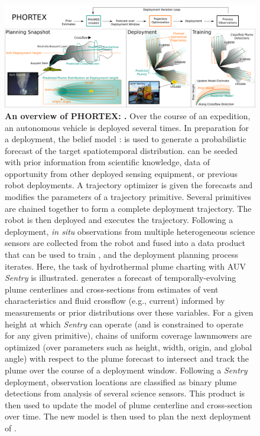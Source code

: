 \begin{figure}[h!]
    \centering
    \includegraphics[width=\columnwidth]{figures/summary_intro_figure.png}
    \caption[An overview of \PHORTEX: \phortex]{\textbf{An overview of PHORTEX: \phortex.} Over the course of an expedition, an autonomous vehicle is deployed several times. In preparation for a deployment, the belief model \PHUMES: \phumes is used to generate a probabilistic forecast of the target spatiotemporal distribution. \PHUMES can be seeded with prior information from scientific knowledge, data of opportunity from other deployed sensing equipment, or previous robot deployments. A trajectory optimizer is given the forecasts and modifies the parameters of a trajectory primitive. Several primitives are chained together to form a complete deployment trajectory. The robot is then deployed and executes the trajectory. Following a deployment, \emph{in situ} observations from multiple heterogeneous science sensors are collected from the robot and fused into a data product that can be used to train \PHUMES, and the deployment planning process iterates. Here, the task of hydrothermal plume charting with AUV \emph{Sentry} is illustrated. \PHUMES generates a forecast of temporally-evolving plume centerlines and cross-sections from estimates of vent characteristics and fluid crossflow (e.g., current) informed by measurements or prior distributions over these variables. For a given height at which \emph{Sentry} can operate (and is constrained to operate for any given primitive), chains of uniform coverage lawnmowers are optimized (over parameters such as height, width, origin, and global angle) with respect to the plume forecast to intersect and track the plume over the course of a deployment window. Following a \emph{Sentry} deployment, observation locations are classified as binary plume detections from analysis of several science sensors. This product is then used to update the \PHUMES model of plume centerline and cross-section over time. The new \PHUMES model is then used to plan the next deployment of \Sentry.}
    \label{fig:intro_summary}
\end{figure}


